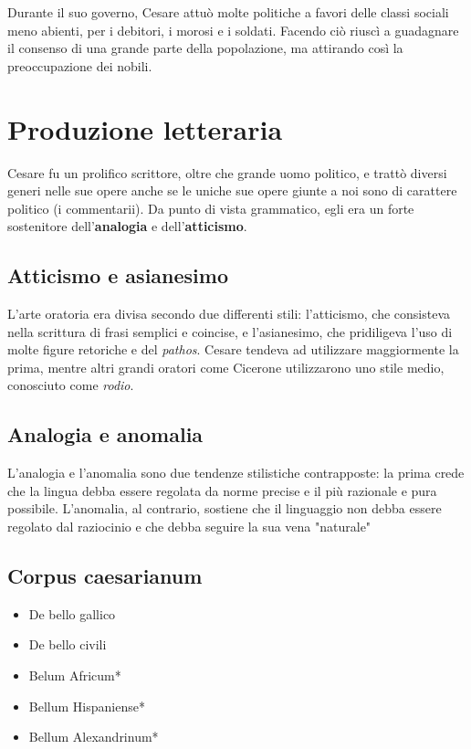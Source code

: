 \documentclass[10pt,a4paper]{article}
\begin{document}
Durante il suo governo, Cesare attuò molte politiche a favori delle classi sociali meno abienti, per i debitori, i morosi e i soldati. Facendo ciò riuscì a guadagnare il consenso di una grande parte della popolazione, ma attirando così la preoccupazione dei nobili.

\section{Produzione letteraria}

Cesare fu un prolifico scrittore, oltre che grande uomo politico, e trattò diversi generi nelle sue opere anche se le uniche sue opere giunte a noi sono di carattere politico (i commentarii). Da punto di vista grammatico, egli era un forte sostenitore dell'\textbf{analogia} e dell'\textbf{atticismo}.

\subsection{Atticismo e asianesimo}

L'arte oratoria era divisa secondo due differenti stili: l'atticismo, che consisteva nella scrittura di frasi semplici e coincise, e l'asianesimo, che pridiligeva l'uso di molte figure retoriche e del \textit{pathos}. Cesare tendeva ad utilizzare maggiormente la prima, mentre altri grandi oratori come Cicerone utilizzarono uno stile medio, conosciuto come \textit{rodio}.

\subsection{Analogia e anomalia}

L'analogia e l'anomalia sono due tendenze stilistiche contrapposte: la prima crede che la lingua debba essere regolata da norme precise e il più razionale e pura possibile. L'anomalia, al contrario, sostiene che il linguaggio non debba essere regolato dal raziocinio e che debba seguire la sua vena "naturale"

\subsection{Corpus caesarianum}

\begin{itemize}
	\item De bello gallico
	\item De bello civili
	\item Belum Africum*
	\item Bellum Hispaniense*
	\item Bellum Alexandrinum*
\end{itemize}
\end{document}
